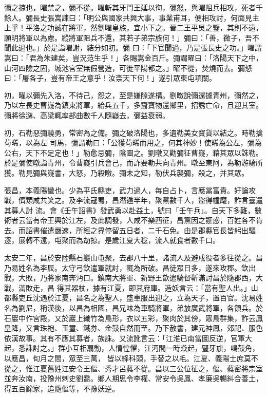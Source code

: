 \begin{pinyinscope}
 彌之掠也，曜禁之，彌不從。曜斬其牙門王延以徇，彌怒，與曜阻兵相攻，死者千餘人。彌長史張嵩諫曰：「明公與國家共興大事，事業甫耳，便相攻討，何面見主上乎！平洛之功誠在將軍，然劉曜皇族，宜小下之。晉二王平吳之鑒，其則不遠，願明將軍以為慮。縱將軍阻兵不還，其若子弟宗族何！」彌曰：「善，微子，吾不聞此過也。」於是詣曜謝，結分如初。彌
 曰：「下官聞過，乃是張長史之功。」曜謂嵩曰：「君為朱建矣，豈況范生乎！」各賜嵩金百斤。彌謂曜曰：「洛陽天下之中，山河四險之固，城池宮室無假營造，可徙平陽都之。」曜不從，焚燒而去。彌怒曰：「屠各子，豈有帝王之意乎！汝柰天下何！」遂引眾東屯項關。



 初，曜以彌先入洛，不待己，怨之，至是嫌隙遂構。劉暾說彌還據青州，彌然之，乃以左長史曹嶷為鎮東將軍，給兵五千，多齎寶物還鄉里，招誘亡命，且迎其室。彌將徐邈、高梁輒率部曲數千人隨嶷去，彌益衰弱。



 初，石勒惡彌驍勇，常密為之備。彌之破洛陽也，多遺勒美女寶貨以結之。時勒擒茍晞，以為左
 司馬，彌謂勒曰：「公獲茍晞而用之，何其神妙！使晞為公左，彌為公右，天下不足定也！」勒愈忌彌，陰圖之。劉暾又勸彌征曹嶷，藉其眾以誅勒。於是彌使暾詣青州，令曹嶷引兵會己，而詐要勒共向青州。暾至東阿，為勒游騎所獲。勒見彌與嶷書，大怒，乃殺暾。彌未之知，勒伏兵襲彌，殺之，并其眾。



 張昌，本義陽蠻也。少為平氏縣吏，武力過人，每自占卜，言應當富貴。好論攻戰，儕類咸共笑之。及李流寇蜀，昌潛遁半年，聚黨數千人，盜得幢麾，詐言臺遣其募人討
 流。會《壬午詔書》發武勇以赴益土，號曰「壬午兵」。自天下多難，數術者云當有帝王興於江左，及此調發，人咸不樂西征，昌黨因之誑惑，百姓各不肯去。而詔書催遣嚴速，所經之界停留五日者，二千石免。由是郡縣官長皆躬出驅逐，展轉不遠，屯聚而為劫掠。是歲江夏大稔，流人就食者數千口。



 太安二年，昌於安陸縣石巖山屯聚，去郡八十里，諸流人及避戍役者多往從之。昌乃易姓名為李辰。太守弓欽遣軍就討，輒為所破。昌徒眾日多，遂來攻郡。欽出戰，大敗，乃將家南奔沔口。鎮南大將軍、新野王歆遣騎督靳滿討昌於隨郡西，大戰，滿敗走，昌
 得其器杖，據有江夏，即其府庫。造妖言云：「當有聖人出。」山都縣吏丘沈遇於江夏，昌名之為聖人，盛車服出迎之，立為天子，置百官。沈易姓名為劉尼，稱漢後，以昌為相國，昌兄味為車騎將軍，弟放廣武將軍，各領兵。於石巖中作宮殿，又於巖上織竹為鳥形，衣以五彩，聚肉於其傍，眾鳥群集，詐云鳳皇降，又言珠袍、玉璽、鐵券、金鼓自然而至。乃下赦書，建元神鳳，郊祀、服色依漢故事。其有不應其募者，族誅。又流訛言云：「江淮已南當圖反逆，官軍大起，悉誅討之。」群小互相扇動，人情惶懼，江沔間一時猋起，豎牙旗，鳴鼓角，以應昌，旬月之間，眾至三萬，
 皆以絳科頭，手替之以毛。江夏、義陽士庶莫不從之，惟江夏舊姓江安令王傴、秀才呂蕤不從。昌以三公位征之，傴、蕤密將宗室並奔汝南，投豫州刺史劉喬。鄉人期思令李權、常安令吳鳳、孝廉吳暢糾合善土，得五百餘家，追隨傴等，不豫妖逆。




\end{pinyinscope}
